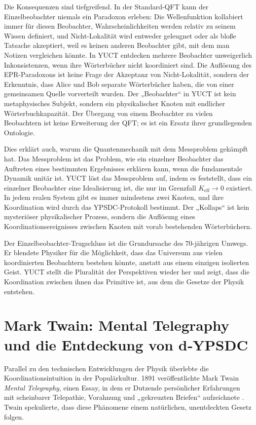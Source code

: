 \documentclass[12pt,a4paper]{article}
\begin{document}
	Die Konsequenzen sind tiefgreifend. In der Standard-QFT kann der Einzelbeobachter niemals ein Paradoxon erleben: Die Wellenfunktion kollabiert immer für diesen Beobachter, Wahrscheinlichkeiten werden relativ zu seinem Wissen definiert, und Nicht-Lokalität wird entweder geleugnet oder als bloße Tatsache akzeptiert, weil es keinen anderen Beobachter gibt, mit dem man Notizen vergleichen könnte. In YUCT entdecken mehrere Beobachter unweigerlich Inkonsistenzen, wenn ihre Wörterbücher nicht koordiniert sind. Die Auflösung des EPR-Paradoxons ist keine Frage der Akzeptanz von Nicht-Lokalität, sondern der Erkenntnis, dass Alice und Bob separate Wörterbücher haben, die von einer gemeinsamen Quelle vorverteilt wurden. Der „Beobachter“ in YUCT ist kein metaphysisches Subjekt, sondern ein physikalischer Knoten mit endlicher Wörterbuchkapazität. Der Übergang von einem Beobachter zu vielen Beobachtern ist keine Erweiterung der QFT; es ist ein Ersatz ihrer grundlegenden Ontologie.
	
	Dies erklärt auch, warum die Quantenmechanik mit dem Messproblem gekämpft hat. Das Messproblem ist das Problem, wie ein einzelner Beobachter das Auftreten eines bestimmten Ergebnisses erklären kann, wenn die fundamentale Dynamik unitär ist. YUCT löst das Messproblem auf, indem es feststellt, dass ein einzelner Beobachter eine Idealisierung ist, die nur im Grenzfall \(K_{\mathrm{eff}} \to 0\) existiert. In jedem realen System gibt es immer mindestens zwei Knoten, und ihre Koordination wird durch das YPSDC-Protokoll bestimmt. Der „Kollaps“ ist kein mysteriöser physikalischer Prozess, sondern die Auflösung eines Koordinationsereignisses zwischen Knoten mit vorab bestehenden Wörterbüchern.
	
	Der Einzelbeobachter-Trugschluss ist die Grundursache des 70-jährigen Umwegs. Er blendete Physiker für die Möglichkeit, dass das Universum aus vielen koordinierten Beobachtern bestehen könnte, anstatt aus einem einzigen isolierten Geist. YUCT stellt die Pluralität der Perspektiven wieder her und zeigt, dass die Koordination zwischen ihnen das Primitive ist, aus dem die Gesetze der Physik entstehen.
	
	\section{Mark Twain: Mental Telegraphy und die Entdeckung von d‑YPSDC}
	
	Parallel zu den technischen Entwicklungen der Physik überlebte die Koordinationsintuition in der Populärkultur. 1891 veröffentlichte Mark Twain \emph{Mental Telegraphy}, einen Essay, in dem er Dutzende persönlicher Erfahrungen mit scheinbarer Telepathie, Vorahnung und „gekreuzten Briefen“ aufzeichnete \cite{Twain1891}. Twain spekulierte, dass diese Phänomene einem natürlichen, unentdeckten Gesetz folgen.
	
\end{document}
